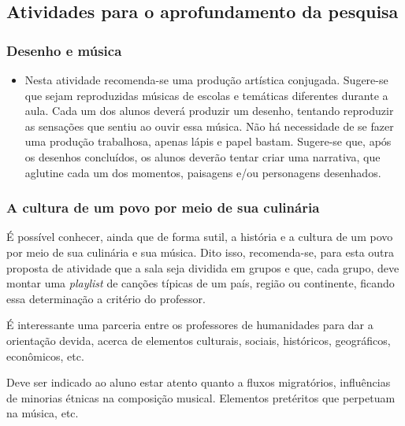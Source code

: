\documentclass[12pt]{extarticle}
\begin{document}
\subsection{Atividades para o aprofundamento da pesquisa}

\subsubsection{Desenho e música}


\begin{itemize}
\item
  Nesta atividade recomenda-se uma produção artística conjugada.
  Sugere-se que sejam reproduzidas músicas de escolas e temáticas
  diferentes durante a aula. Cada um dos alunos deverá produzir um
  desenho, tentando reproduzir as sensações que sentiu ao ouvir essa
  música. Não há necessidade de se fazer uma produção trabalhosa, apenas
  lápis e papel bastam. Sugere-se que, após os desenhos concluídos, os
  alunos deverão tentar criar uma narrativa, que aglutine cada um dos
  momentos, paisagens e/ou personagens desenhados.
\end{itemize}

\subsubsection{A cultura de um povo por meio de sua culinária}

É possível conhecer, ainda que de forma sutil, a história e a
  cultura de um povo por meio de sua culinária e sua música. Dito isso,
  recomenda-se, para esta outra proposta de atividade que a sala seja
  dividida em grupos e que, cada grupo, deve montar uma \emph{playlist} de
  canções típicas de um país, região ou continente, ficando essa
  determinação a critério do professor.

É interessante uma parceria entre os professores de humanidades
para dar a orientação devida, acerca de elementos culturais, sociais,
históricos, geográficos, econômicos, etc.

{Deve ser indicado ao aluno estar atento quanto a fluxos
migratórios, influências de minorias étnicas na composição musical.
Elementos pretéritos que perpetuam na música, etc.}

\end{document}
